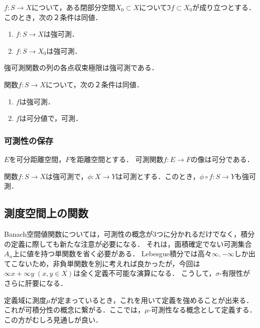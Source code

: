 \documentclass[uplatex,dvipdfmx]{jsreport}
\begin{document}
\begin{corollary}
    $f:S\to X$について，ある閉部分空間$X_0\subset X$について$\Im f\subset X_0$が成り立つとする．
    このとき，次の２条件は同値．
    \begin{enumerate}
        \item $f:S\to X$は強可測．
        \item $f:S\to X_0$は強可測．
    \end{enumerate}
\end{corollary}

\begin{corollary}
    強可測関数の列の各点収束極限は強可測である．
\end{corollary}

\begin{corollary}
    関数$f:S\to X$について，次の２条件は同値．
    \begin{enumerate}
        \item $f$は強可測．
        \item $f$は可分値で，可測．
    \end{enumerate}
\end{corollary}

\subsubsection{可測性の保存}

\begin{lemma}
    $E$を可分距離空間，$F$を距離空間とする．
    可測関数$f:E\to F$の像は可分である．
\end{lemma}

\begin{corollary}
    関数$f:S\to X$は強可測で，$\phi:X\to Y$は可測とする．このとき，$\phi\circ f:S\to Y$も強可測．
\end{corollary}

\subsection{測度空間上の関数}

\begin{tcolorbox}[colframe=ForestGreen, colback=ForestGreen!10!white,breakable,colbacktitle=ForestGreen!40!white,coltitle=black,fonttitle=\bfseries\sffamily,
title=]
    Banach空間値関数については，可測性の概念が3つに分かれるだけでなく，積分の定義に際しても新たな注意が必要になる．
    それは，面積確定でない可測集合$A_n$上に値を持つ単関数を省く必要がある．
    Lebesgue積分では高々$\infty,-\infty$しか出てこないため，非負単関数を別に考えれば良かったが，今回は$\infty x+\infty y\;(x,y\in X)$は全く定義不可能な演算になる．
    こうして，$\sigma$-有限性がさらに肝要になる．

    定義域に測度$\mu$が定まっているとき，これを用いて定義を強めることが出来る．
    これが可積分性の概念に繋がる．ここでは，$\mu$-可測性なる概念として定義する．
    この方がむしろ見通しが良い．
\end{tcolorbox}
\end{document}
